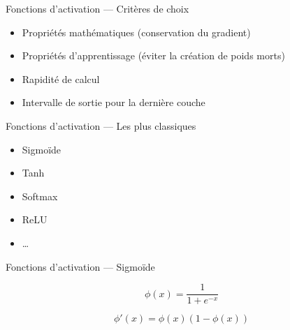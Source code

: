 \begin{frame}{Fonctions d'activation --- Critères de choix}
  \begin{itemize}[<+->]
    \item Propriétés mathématiques (conservation du gradient)
    \item Propriétés d'apprentissage (éviter la création de poids morts)
    \item Rapidité de calcul
    \item Intervalle de sortie pour la dernière couche
  \end{itemize}
\end{frame}

\begin{frame}{Fonctions d'activation --- Les plus classiques}
  \begin{itemize}
  \item Sigmoïde
  \item Tanh
  \item Softmax
  \item ReLU
  \item …
  \end{itemize}
\end{frame}

\begin{frame}{Fonctions d'activation --- Sigmoïde}
  \begin{center}
  \end{center}

  \begin{description}[<+->]
    \item[Définition] \[\phi(x) = \frac{1}{1 + e^{-x}}\]
    \item[Dérivée] \[\phi'(x)=\phi(x)(1-\phi(x))\]
  \end{description}
\end{frame}

